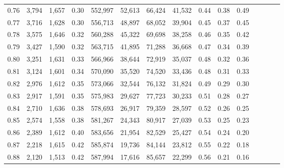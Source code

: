 \begin{tabular}{rrrcrrrrrrrrrrr}
0.76 &   3,794 &  1,657 &                                       0.30 &  552,997 &   52,613 &   66,424 &   41,532 &  0.44 &  0.38 &                         0.49 \\
0.77 &   3,716 &  1,628 &                                       0.30 &  556,713 &   48,897 &   68,052 &   39,904 &  0.45 &  0.37 &                         0.45 \\
0.78 &   3,575 &  1,646 &                                       0.32 &  560,288 &   45,322 &   69,698 &   38,258 &  0.46 &  0.35 &                         0.42 \\
0.79 &   3,427 &  1,590 &                                       0.32 &  563,715 &   41,895 &   71,288 &   36,668 &  0.47 &  0.34 &                         0.39 \\
0.80 &   3,251 &  1,631 &                                       0.33 &  566,966 &   38,644 &   72,919 &   35,037 &  0.48 &  0.32 &                         0.36 \\
0.81 &   3,124 &  1,601 &                                       0.34 &  570,090 &   35,520 &   74,520 &   33,436 &  0.48 &  0.31 &                         0.33 \\
0.82 &   2,976 &  1,612 &                                       0.35 &  573,066 &   32,544 &   76,132 &   31,824 &  0.49 &  0.29 &                         0.30 \\
0.83 &   2,917 &  1,591 &                                       0.35 &  575,983 &   29,627 &   77,723 &   30,233 &  0.51 &  0.28 &                         0.27 \\
0.84 &   2,710 &  1,636 &                                       0.38 &  578,693 &   26,917 &   79,359 &   28,597 &  0.52 &  0.26 &                         0.25 \\
0.85 &   2,574 &  1,558 &                                       0.38 &  581,267 &   24,343 &   80,917 &   27,039 &  0.53 &  0.25 &                         0.23 \\
0.86 &   2,389 &  1,612 &                                       0.40 &  583,656 &   21,954 &   82,529 &   25,427 &  0.54 &  0.24 &                         0.20 \\
0.87 &   2,218 &  1,615 &                                       0.42 &  585,874 &   19,736 &   84,144 &   23,812 &  0.55 &  0.22 &                         0.18 \\
0.88 &   2,120 &  1,513 &                                       0.42 &  587,994 &   17,616 &   85,657 &   22,299 &  0.56 &  0.21 &                         0.16 \\

\end{tabular}
